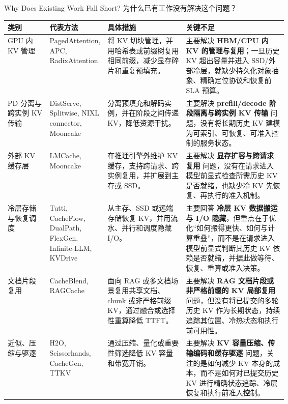 \documentclass[aspectratio=169,10pt]{beamer}
\begin{document}
\begin{frame}[t]{Why Does Existing Work Fall Short? 为什么已有工作没有解决这个问题？}
\fontsize{6.8pt}{7.6pt}\selectfont
\vspace{-0.8em}

\setlength{\tabcolsep}{2.4pt}
\renewcommand{\arraystretch}{1.25}
\begin{tabularx}{\linewidth}{
>{\raggedright\arraybackslash}p{0.15\linewidth}
>{\centering\arraybackslash}p{0.20\linewidth}
>{\raggedright\arraybackslash}p{0.29\linewidth}
>{\raggedright\arraybackslash}X}
\rowcolor{gray!35}
\textbf{类别} & \textbf{代表方法} & \textbf{具体措施} & \textbf{关键不足} \\
\hline

GPU 内 KV 管理 &
PagedAttention, APC, RadixAttention &
将 KV 切块管理，并用哈希表或前缀树复用相同前缀，减少显存碎片和重复预填充。 &
主要解决 \textbf{HBM/CPU 内 KV 的管理与复用}；一旦历史 KV 超出容量并进入 SSD/外部冷层，就缺少持久化对象抽象、精确定位协议和恢复前 SLA 预算。 \\
\hline

PD 分离与跨实例 KV 传输 &
DistServe, Splitwise, NIXL connector, Mooncake &
分离预填充和解码实例，并在阶段之间传递 KV，降低资源干扰。 &
主要解决 \textbf{prefill/decode 阶段隔离与跨实例 KV 传输} 问题，没有将长期历史 KV 建模为可索引、可恢复、可准入控制的服务状态。 \\
\hline

外部 KV 缓存层 &
LMCache, Mooncake &
在推理引擎外维护 KV 缓存，支持跨请求、跨实例复用，并扩展到主存或 SSD。 &
主要解决 \textbf{显存扩容与跨请求复用} 问题，没有在请求进入模型前显式检查所需历史 KV 是否就绪，也缺少冷 KV 先恢复、再执行的准入机制。 \\
\hline

冷层存储与恢复调度 &
Tutti, CacheFlow, DualPath, FlexGen, Infinite-LLM, KVDrive &
从主存、SSD 或远端存储恢复 KV，并用流水、并行和调度隐藏 I/O。 &
主要回答 \textbf{冷层 KV 数据搬运与 I/O 隐藏}，但重点在于优化“如何搬得更快、如何与计算重叠”，而不是在请求进入模型前显式判断其历史 KV 依赖是否就绪，并据此做等待、恢复、重算或准入决策。 \\
\hline

文档片段复用 &
CacheBlend, RAGCache &
面向 RAG 或多文档场景复用共享文档、chunk 或非严格前缀 KV，通过融合或选择性重算降低 TTFT。 &
主要解决 \textbf{RAG 文档片段或非严格前缀的 KV 局部复用} 问题，但没有将已提交的多轮历史 KV 作为长期状态，持续追踪其位置、冷热状态和执行前可用性。 \\
\hline

近似、压缩与驱逐 &
H2O, Scissorhands, CacheGen, TTKV &
通过压缩、量化或重要性筛选降低 KV 容量和带宽开销。&
主要解决 \textbf{KV 容量压缩、传输编码和缓存驱逐} 问题，关注的是如何减少 KV 本身的成本，而不是如何对已提交历史 KV 进行精确状态追踪、冷层恢复和执行前准入控制。 \\
\end{tabularx}


\end{frame}
\end{document}
